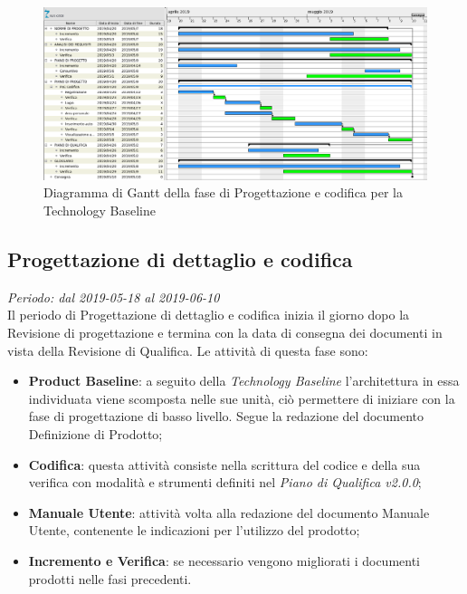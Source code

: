 \begin{figure}[H]
	\includegraphics[width=0.99\linewidth]{res/images/gantt_pa.png}
	\caption{Diagramma di Gantt della fase di Progettazione e codifica per la Technology Baseline}
\end{figure}


\subsection{Progettazione di dettaglio e codifica}
\textit{Periodo: dal 2019-05-18 al 2019-06-10} \\
Il periodo di Progettazione di dettaglio e codifica inizia il giorno dopo la Revisione di progettazione e termina con la data di consegna dei documenti 
in vista della Revisione di Qualifica. Le attività di questa fase sono:
\begin{itemize}
	\item \textbf{Product Baseline\glo}: a seguito della \textit{Technology 
	Baseline\glosp} l'architettura in essa individuata viene scomposta nelle sue unità, ciò permettere di iniziare con la fase di progettazione di basso livello. Segue la redazione del documento Definizione di Prodotto;
	\item \textbf{Codifica}: questa attività consiste nella scrittura del 
	codice e della sua verifica con modalità e strumenti definiti nel 
	\textit{Piano di Qualifica v2.0.0};
	\item \textbf{Manuale Utente}: attività volta alla redazione del documento Manuale Utente, contenente le indicazioni per l'utilizzo del prodotto;
	\item \textbf{Incremento e Verifica}: se necessario vengono migliorati i 
	documenti prodotti nelle fasi precedenti.
\end{itemize}

